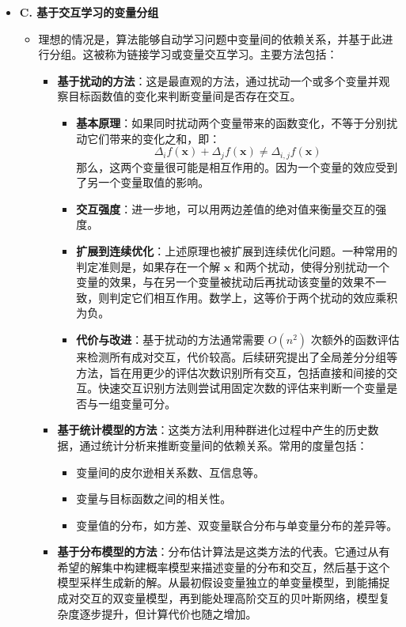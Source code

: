 \begin{itemize}
    \item \textbf{C. 基于交互学习的变量分组}
    \begin{itemize}
        \item 理想的情况是，算法能够自动学习问题中变量间的依赖关系，并基于此进行分组。这被称为链接学习或变量交互学习。主要方法包括：
        \begin{itemize}
            \item \textbf{基于扰动的方法}：这是最直观的方法，通过扰动一个或多个变量并观察目标函数值的变化来判断变量间是否存在交互。
            \begin{itemize}
                \item \textbf{基本原理}：如果同时扰动两个变量带来的函数变化，不等于分别扰动它们带来的变化之和，即：
                \[ \Delta_{i}f(\mathbf{x}) + \Delta_{j}f(\mathbf{x}) \neq \Delta_{i,j}f(\mathbf{x}) \]
                那么，这两个变量很可能是相互作用的。因为一个变量的效应受到了另一个变量取值的影响。
                \item \textbf{交互强度}：进一步地，可以用两边差值的绝对值来衡量交互的强度。
                \item \textbf{扩展到连续优化}：上述原理也被扩展到连续优化问题。一种常用的判定准则是，如果存在一个解 $\mathbf{x}$ 和两个扰动，使得分别扰动一个变量的效果，与在另一个变量被扰动后再扰动该变量的效果不一致，则判定它们相互作用。数学上，这等价于两个扰动的效应乘积为负。
                \item \textbf{代价与改进}：基于扰动的方法通常需要 $O(n^2)$ 次额外的函数评估来检测所有成对交互，代价较高。后续研究提出了全局差分分组等方法，旨在用更少的评估次数识别所有交互，包括直接和间接的交互。快速交互识别方法则尝试用固定次数的评估来判断一个变量是否与一组变量可分。
            \end{itemize}
            \item \textbf{基于统计模型的方法}：这类方法利用种群进化过程中产生的历史数据，通过统计分析来推断变量间的依赖关系。常用的度量包括：
            \begin{itemize}
                \item 变量间的皮尔逊相关系数、互信息等。
                \item 变量与目标函数之间的相关性。
                \item 变量值的分布，如方差、双变量联合分布与单变量分布的差异等。
            \end{itemize}
            \item \textbf{基于分布模型的方法}：分布估计算法是这类方法的代表。它通过从有希望的解集中构建概率模型来描述变量的分布和交互，然后基于这个模型采样生成新的解。从最初假设变量独立的单变量模型，到能捕捉成对交互的双变量模型，再到能处理高阶交互的贝叶斯网络，模型复杂度逐步提升，但计算代价也随之增加。

\end{itemize}
\end{itemize}
\end{itemize}
